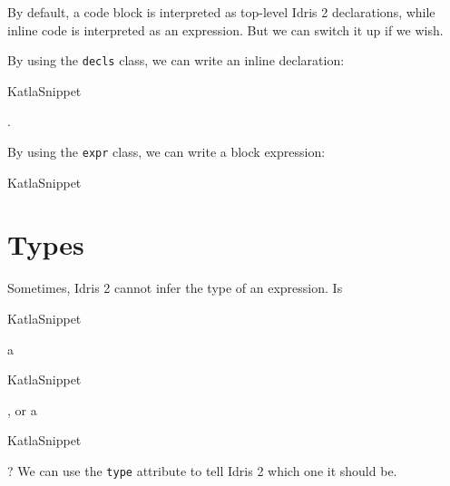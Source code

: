 By default, a code block is interpreted as top-level Idris 2
declarations, while inline code is interpreted as an expression. But we
can switch it up if we wish.

By using the \texttt{decls} class, we can write an inline declaration:
\let\KatlaSnippet\relax{}\newcommand\KatlaSnippet[1][]{\UseVerb[#1]{KatlaSnippet}}
\begin{SaveVerbatim}[commandchars=\\\{\}]{KatlaSnippet}
\KatlaSpace{}\IdrisKeyword{:}\KatlaSpace{}\KatlaSpace{}\IdrisKeyword{\KatlaDash{}>}\KatlaSpace{}\KatlaNewline{}
\end{SaveVerbatim}
\KatlaSnippet{}.

By using the \texttt{expr} class, we can write a block expression:

\let\KatlaSnippet\relax{}\newcommand\KatlaSnippet[1][]{\BUseVerbatim[#1]{KatlaSnippet}}
\begin{SaveVerbatim}[commandchars=\\\{\}]{KatlaSnippet}
\IdrisData{[}\KatlaNewline{}
\KatlaSpace{}\KatlaSpace{}\KatlaSpace{}\KatlaSpace{}\KatlaNewline{}
\KatlaSpace{}\KatlaSpace{}\KatlaSpace{}\KatlaSpace{}\KatlaNewline{}
\KatlaSpace{}\KatlaSpace{}\KatlaSpace{}\KatlaSpace{}\KatlaNewline{}
\IdrisData{]}\KatlaNewline{}
\end{SaveVerbatim}
\KatlaSnippet{}

\hypertarget{types}{%
\section{Types}\label{types}}

Sometimes, Idris 2 cannot infer the type of an expression. Is
\let\KatlaSnippet\relax{}\newcommand\KatlaSnippet[1][]{\UseVerb[#1]{KatlaSnippet}}
\begin{SaveVerbatim}[commandchars=\\\{\}]{KatlaSnippet}
\IdrisData{[1,}\KatlaSpace{}\KatlaSpace{}\IdrisData{3]}\KatlaNewline{}
\end{SaveVerbatim}
\KatlaSnippet{} a
\let\KatlaSnippet\relax{}\newcommand\KatlaSnippet[1][]{\UseVerb[#1]{KatlaSnippet}}
\begin{SaveVerbatim}[commandchars=\\\{\}]{KatlaSnippet}
\KatlaSpace{}\KatlaNewline{}
\end{SaveVerbatim}
\KatlaSnippet{}, or a
\let\KatlaSnippet\relax{}\newcommand\KatlaSnippet[1][]{\UseVerb[#1]{KatlaSnippet}}
\begin{SaveVerbatim}[commandchars=\\\{\}]{KatlaSnippet}
\KatlaSpace{}\KatlaSpace{}\KatlaNewline{}
\end{SaveVerbatim}
\KatlaSnippet{}? We can use the \texttt{type} attribute to tell Idris 2
which one it should be.

